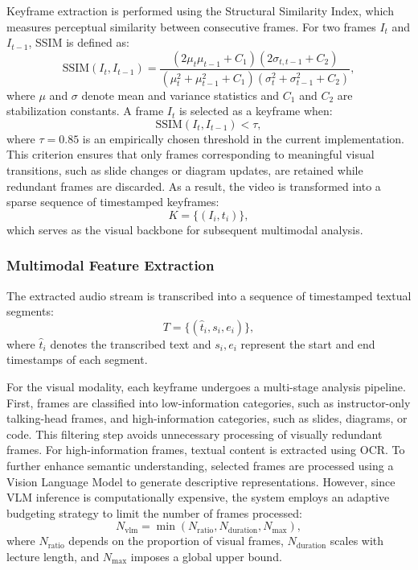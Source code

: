 \documentclass[conference]{IEEEtran}
\begin{document}
    Keyframe extraction is performed using the Structural Similarity Index, which measures perceptual similarity between consecutive frames. For two frames $I_t$ and $I_{t-1}$, SSIM is defined as:
    \begin{equation}
    \text{SSIM}(I_t, I_{t-1}) =
    \frac{(2\mu_t \mu_{t-1} + C_1)(2\sigma_{t,t-1} + C_2)}
    {(\mu_t^2 + \mu_{t-1}^2 + C_1)(\sigma_t^2 + \sigma_{t-1}^2 + C_2)},
    \end{equation}
    where $\mu$ and $\sigma$ denote mean and variance statistics and $C_1$ and $C_2$ are stabilization constants. A frame $I_t$ is selected as a keyframe when:
    \begin{equation}
    \text{SSIM}(I_t, I_{t-1}) < \tau,
    \end{equation}
    where $\tau = 0.85$ is an empirically chosen threshold in the current implementation. This criterion ensures that only frames corresponding to meaningful visual transitions, such as slide changes or diagram updates, are retained while redundant frames are discarded. As a result, the video is transformed into a sparse sequence of timestamped keyframes:
    \begin{equation}
    K = \{(I_i, t_i)\},
    \end{equation}
    which serves as the visual backbone for subsequent multimodal analysis.

    \subsubsection{Multimodal Feature Extraction}

    The extracted audio stream is transcribed into a sequence of timestamped textual segments:
    \begin{equation}
    T = \{(\hat{t}_i, s_i, e_i)\},
    \end{equation}
    where $\hat{t}_i$ denotes the transcribed text and $s_i, e_i$ represent the start and end timestamps of each segment.

    For the visual modality, each keyframe undergoes a multi-stage analysis pipeline. First, frames are classified into low-information categories, such as instructor-only talking-head frames, and high-information categories, such as slides, diagrams, or code. This filtering step avoids unnecessary processing of visually redundant frames. For high-information frames, textual content is extracted using OCR. To further enhance semantic understanding, selected frames are processed using a Vision Language Model to generate descriptive representations. However, since VLM inference is computationally expensive, the system employs an adaptive budgeting strategy to limit the number of frames processed:
    \begin{equation}
    N_{\text{vlm}} = \min(N_{\text{ratio}}, N_{\text{duration}}, N_{\max}),
    \label{eq:nvlm}
    \end{equation}
    where $N_{\text{ratio}}$ depends on the proportion of visual frames, $N_{\text{duration}}$ scales with lecture length, and $N_{\max}$ imposes a global upper bound.
\end{document}
